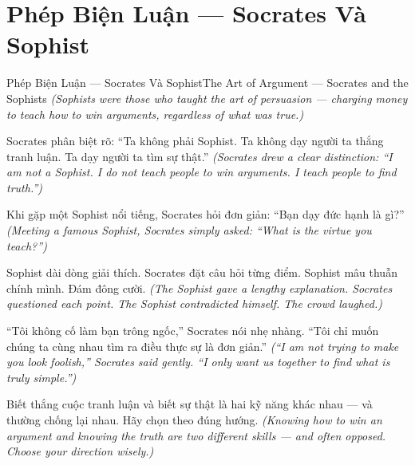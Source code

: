 \section{Phép Biện Luận — Socrates Và Sophist}
\begin{truyen}{Phép Biện Luận — Socrates Và Sophist}{The Art of Argument — Socrates and the Sophists}
\textit{(Sophists were those who taught the art of persuasion — charging money to teach how to win arguments, regardless of what was true.)}

Socrates phân biệt rõ: ``Ta không phải Sophist. Ta không dạy người ta thắng tranh luận. Ta dạy người ta tìm sự thật.''
\textit{(Socrates drew a clear distinction: ``I am not a Sophist. I do not teach people to win arguments. I teach people to find truth.'')}

Khi gặp một Sophist nổi tiếng, Socrates hỏi đơn giản: ``Bạn dạy đức hạnh là gì?''
\textit{(Meeting a famous Sophist, Socrates simply asked: ``What is the virtue you teach?'')}

Sophist dài dòng giải thích. Socrates đặt câu hỏi từng điểm. Sophist mâu thuẫn chính mình. Đám đông cười.
\textit{(The Sophist gave a lengthy explanation. Socrates questioned each point. The Sophist contradicted himself. The crowd laughed.)}

``Tôi không cố làm bạn trông ngốc,'' Socrates nói nhẹ nhàng. ``Tôi chỉ muốn chúng ta cùng nhau tìm ra điều thực sự là đơn giản.''
\textit{(``I am not trying to make you look foolish,'' Socrates said gently. ``I only want us together to find what is truly simple.'')}

\end{truyen}

\begin{baihoc}
Biết thắng cuộc tranh luận và biết sự thật là hai kỹ năng khác nhau — và thường chống lại nhau. Hãy chọn theo đúng hướng.
\textit{(Knowing how to win an argument and knowing the truth are two different skills — and often opposed. Choose your direction wisely.)}
\end{baihoc}
\ngancach

